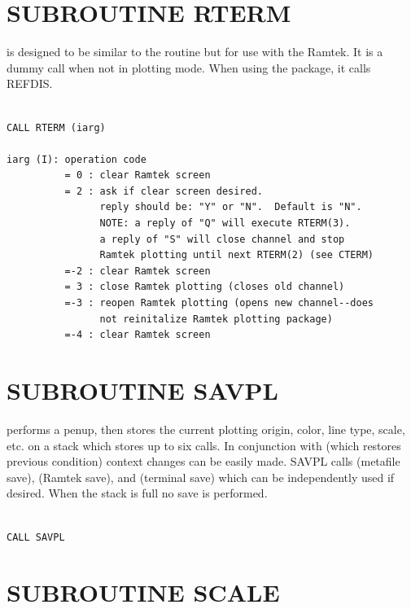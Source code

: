 \documentclass[11pt]{report}
\begin{document}
\section{SUBROUTINE RTERM}

 is designed to be similar to the  routine but
for use with the Ramtek. It is a dummy call when not in 
plotting mode.  When using the  package, it calls REFDIS.
\begin{verbatim}

CALL RTERM (iarg)

iarg (I): operation code
          = 0 : clear Ramtek screen
          = 2 : ask if clear screen desired. 
                reply should be: "Y" or "N".  Default is "N".
                NOTE: a reply of "Q" will execute RTERM(3).
                a reply of "S" will close channel and stop
                Ramtek plotting until next RTERM(2) (see CTERM)
          =-2 : clear Ramtek screen
          = 3 : close Ramtek plotting (closes old channel)
          =-3 : reopen Ramtek plotting (opens new channel--does
                not reinitalize Ramtek plotting package)
          =-4 : clear Ramtek screen
\end{verbatim}

\section{SUBROUTINE SAVPL}

 performs a penup, then stores the current plotting origin, color,
line type, scale, etc. on a stack which stores up to six calls.  In
conjunction with  (which restores previous condition) context
changes can be easily made.  SAVPL calls  (metafile
save),  (Ramtek save), and  (terminal save) which
can be independently used if desired.  When the stack is full no save
is performed.
\begin{verbatim}

CALL SAVPL
\end{verbatim}

\section{SUBROUTINE SCALE}
\end{document}
